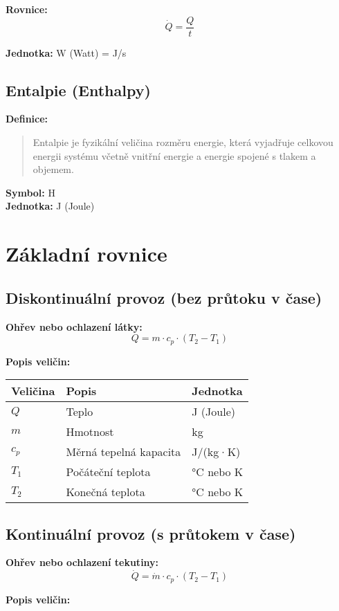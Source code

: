 \documentclass[11pt,a4paper]{article}
\begin{document}
\textbf{Rovnice:}
\[\dot{Q} = \frac{Q}{t}\]

\textbf{Jednotka:} W (Watt) = J/s

\subsection{Entalpie (Enthalpy)}

\textbf{Definice:}
\begin{quote}
Entalpie je fyzikální veličina rozměru energie, která vyjadřuje celkovou energii systému včetně vnitřní energie a energie spojené s tlakem a objemem.
\end{quote}

\textbf{Symbol:} H \\
\textbf{Jednotka:} J (Joule)

\clearpage

\section{Základní rovnice}

\subsection{Diskontinuální provoz (bez průtoku v čase)}

\textbf{Ohřev nebo ochlazení látky:}
\[Q = m \cdot c_p \cdot (T_2 - T_1)\]

\textbf{Popis veličin:}

\begin{longtable}{lll}
\toprule
Veličina & Popis & Jednotka \\
\midrule
$Q$ & Teplo & J (Joule) \\
$m$ & Hmotnost & kg \\
$c_p$ & Měrná tepelná kapacita & J/(kg·K) \\
$T_1$ & Počáteční teplota & °C nebo K \\
$T_2$ & Konečná teplota & °C nebo K \\
\bottomrule
\end{longtable}

\subsection{Kontinuální provoz (s průtokem v čase)}

\textbf{Ohřev nebo ochlazení tekutiny:}
\[\dot{Q} = \dot{m} \cdot c_p \cdot (T_2 - T_1)\]

\textbf{Popis veličin:}
\end{document}

